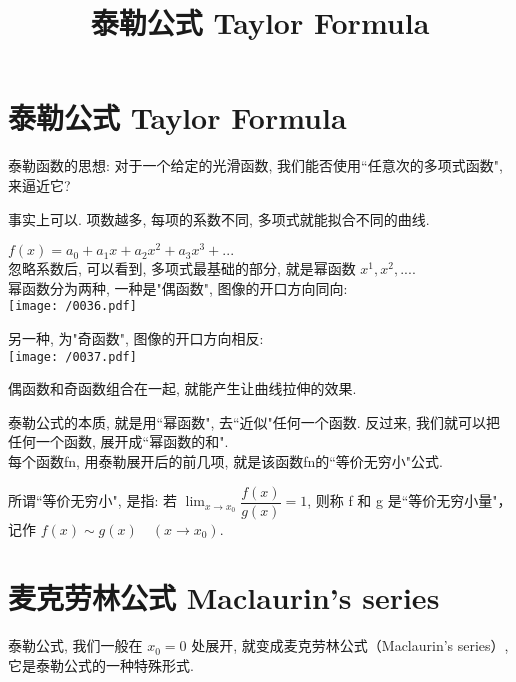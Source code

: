 \documentclass[UTF8]{ctexart}
\title{泰勒公式 Taylor Formula}
\begin{document}
\tableofcontents %
\date{} %
\maketitle  %



\part{泰勒公式  Taylor Formula}

泰勒函数的思想: 对于一个给定的光滑函数, 我们能否使用``任意次的多项式函数", 来逼近它?

事实上可以. 项数越多, 每项的系数不同, 多项式就能拟合不同的曲线.

$f\left( x \right) =a_0+a_1x+a_2x^2+a_3x^3+...$ \\

忽略系数后, 可以看到, 多项式最基础的部分, 就是幂函数 $x^1, x^2, ...$. \\

幂函数分为两种, 一种是"偶函数", 图像的开口方向同向: \\

\texttt{[image: /0036.pdf]}

另一种, 为"奇函数", 图像的开口方向相反: \\

\texttt{[image: /0037.pdf]}

偶函数和奇函数组合在一起, 就能产生让曲线拉伸的效果.

泰勒公式的本质, 就是用``幂函数", 去``近似"任何一个函数. 反过来, 我们就可以把任何一个函数, 展开成``幂函数的和". \\

每个函数fn, 用泰勒展开后的前几项, 就是该函数fn的``等价无穷小"公式.

所谓``等价无穷小", 是指:  若 $\lim_{x \to x_0} \dfrac{f(x)} {g(x)} = 1$, 则称 f 和 g 是``等价无穷小量"，记作 $f(x) \sim g(x) \quad (x \to x_0)$.






\part{麦克劳林公式 Maclaurin's series}

泰勒公式, 我们一般在 $x_0 =0$ 处展开, 就变成麦克劳林公式（Maclaurin's series）, 它是泰勒公式的一种特殊形式. \\
\end{document}
